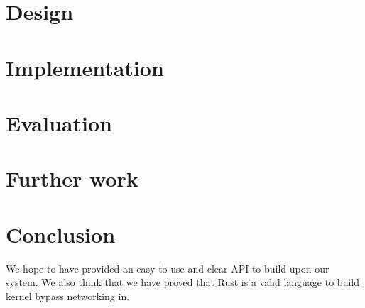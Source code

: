 \documentclass[11pt]{book}
\begin{document}
\setcounter{page}{1}




\tableofcontents




\chapter{Design}



\chapter{Implementation}



\chapter{Evaluation}



\chapter{Further work}



\chapter{Conclusion}

We hope to have provided an easy to use and clear API to build upon
our system. We also think that we have proved that Rust is a valid
language to build kernel bypass networking in. 


{}
\end{document}
